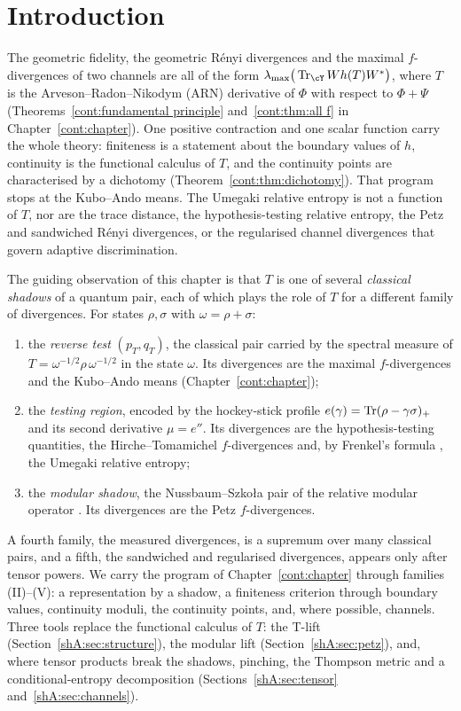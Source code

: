 \section{Introduction}\label{shA:sec:intro}

The geometric fidelity, the geometric R\'enyi divergences and the maximal $f$-divergences of two channels are all of the form $\lambda_{\max}\big(\Tr_\cY W h(T)W^*\big)$, where $T$ is the Arveson--Radon--Nikodym (ARN) derivative of $\Phi$ with respect to $\Phi+\Psi$ (Theorems~\ref{cont:fundamental principle} and~\ref{cont:thm:all f} in Chapter~\ref{cont:chapter}). One positive contraction and one scalar function carry the whole theory: finiteness is a statement about the boundary values of $h$, continuity is the functional calculus of $T$, and the continuity points are characterised by a dichotomy (Theorem~\ref{cont:thm:dichotomy}). That program stops at the Kubo--Ando means. The Umegaki relative entropy is not a function of $T$, nor are the trace distance, the hypothesis-testing relative entropy, the Petz and sandwiched R\'enyi divergences, or the regularised channel divergences that govern adaptive discrimination.

The guiding observation of this chapter is that $T$ is one of several \emph{classical shadows} of a quantum pair, each of which plays the role of $T$ for a different family of divergences. For states $\rho,\sigma$ with $\omega=\rho+\sigma$:
\begin{enumerate}[label=(\Roman*)]
\item the \emph{reverse test} $(p_T,q_T)$, the classical pair carried by the spectral measure of $T=\omega^{-1/2}\rho\,\omega^{-1/2}$ in the state $\omega$. Its divergences are the maximal $f$-divergences and the Kubo--Ando means \cite{Matsumoto2018newf} (Chapter~\ref{cont:chapter});
\item the \emph{testing region}, encoded by the hockey-stick profile $e(\gamma)=\operatorname{Tr}(\rho-\gamma\sigma)_+$ and its second derivative $\mu=e''$. Its divergences are the hypothesis-testing quantities, the Hirche--Tomamichel $f$-divergences \cite{HircheTomamichel2024} and, by Frenkel's formula \cite{Frenkel2023}, the Umegaki relative entropy;
\item the \emph{modular shadow}, the Nussbaum--Szko{\l}a pair of the relative modular operator \cite{NussbaumSzkola2009}. Its divergences are the Petz $f$-divergences.
\end{enumerate}
A fourth family, the measured divergences, is a supremum over many classical pairs, and a fifth, the sandwiched and regularised divergences, appears only after tensor powers. We carry the program of Chapter~\ref{cont:chapter} through families (II)--(V): a representation by a shadow, a finiteness criterion through boundary values, continuity moduli, the continuity points, and, where possible, channels. Three tools replace the functional calculus of $T$: the T-lift (Section~\ref{shA:sec:structure}), the modular lift (Section~\ref{shA:sec:petz}), and, where tensor products break the shadows, pinching, the Thompson metric and a conditional-entropy decomposition (Sections~\ref{shA:sec:tensor} and~\ref{shA:sec:channels}).

